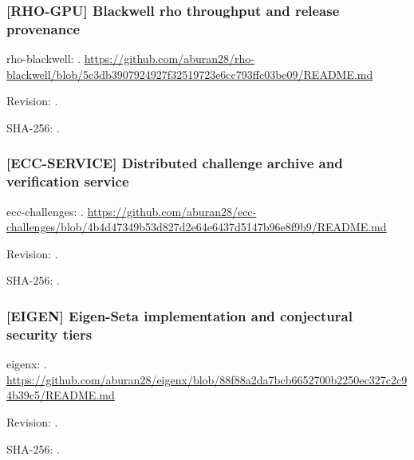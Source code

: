 \par\noindent\begin{minipage}{\linewidth}\small
\subsubsection*{[RHO-GPU] Blackwell rho throughput and release provenance}\label{art:RHO-GPU}
rho-blackwell: .
\url{https://github.com/aburan28/rho-blackwell/blob/5c3db3907924927f32519723e6cc793ffc03be09/README.md}
\par Revision: .
\par SHA-256: .
\end{minipage}\par\medskip

\par\noindent\begin{minipage}{\linewidth}\small
\subsubsection*{[ECC-SERVICE] Distributed challenge archive and verification service}\label{art:ECC-SERVICE}
ecc-challenges: .
\url{https://github.com/aburan28/ecc-challenges/blob/4b4d47349b53d827d2e64e6437d5147b96e8f9b9/README.md}
\par Revision: .
\par SHA-256: .
\end{minipage}\par\medskip

\par\noindent\begin{minipage}{\linewidth}\small
\subsubsection*{[EIGEN] Eigen-Seta implementation and conjectural security tiers}\label{art:EIGEN}
eigenx: .
\url{https://github.com/aburan28/eigenx/blob/88f88a2da7bcb6652700b2250ec327c2c94b39c5/README.md}
\par Revision: .
\par SHA-256: .
\end{minipage}\par\medskip

